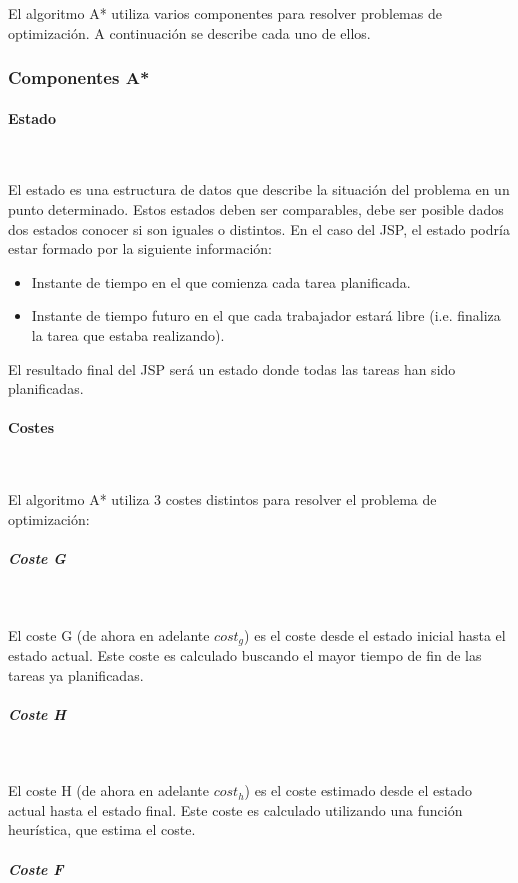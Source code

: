 El algoritmo A* utiliza varios componentes para resolver problemas
de optimización. A continuación se describe cada uno de ellos.

\subsubsection{Componentes A*}

\paragraph{Estado}~

El estado es una estructura de datos que describe la situación
del problema en un punto determinado.
Estos estados deben ser comparables,
debe ser posible dados dos estados conocer si son iguales o distintos.
En el caso del JSP, el estado podría estar formado por la siguiente información:

\begin{itemize}[itemsep=0.25px]
    \item Instante de tiempo en el que comienza cada tarea planificada.
    \item Instante de tiempo futuro en el que cada trabajador estará libre
    (i.e. finaliza la tarea que estaba realizando).
\end{itemize}

El resultado final del JSP será un estado donde todas las tareas han sido planificadas.

\paragraph{Costes}~

El algoritmo A* utiliza 3 costes distintos para resolver el problema de optimización:

\subparagraph{Coste G}~

El coste G (de ahora en adelante $cost_g$) es el coste desde el estado inicial
hasta el estado actual.
Este coste es calculado buscando el mayor tiempo de fin de
las tareas ya planificadas.

\subparagraph{Coste H}~

El coste H (de ahora en adelante $cost_h$) es el coste estimado desde el estado actual
hasta el estado final.
Este coste es calculado utilizando una función heurística,
que estima el coste.

\subparagraph{Coste F}~

